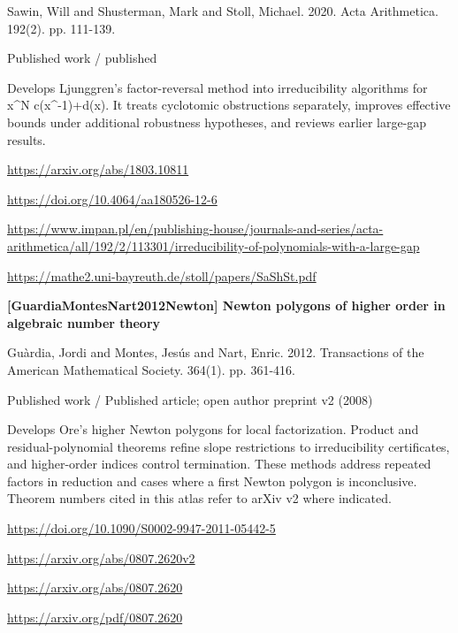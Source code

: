 \documentclass[11pt,a4paper,oneside,openany]{book}
\begin{document}
\color{black} Sawin, Will and Shusterman, Mark and Stoll, Michael. 2020. Acta Arithmetica. 192(2). pp. 111-139.\par
{\small\sffamily\color{atlasgold}Published work / published}\par
\color{black} Develops Ljunggren's factor-reversal method into irreducibility algorithms for x\textasciicircum{}N c(x\textasciicircum{}-1)+d(x). It treats cyclotomic obstructions separately, improves effective bounds under additional robustness hypotheses, and reviews earlier large-gap results.\par
{\footnotesize\url{https://arxiv.org/abs/1803.10811}}\par
{\footnotesize\url{https://doi.org/10.4064/aa180526-12-6}}\par
{\footnotesize\url{https://www.impan.pl/en/publishing-house/journals-and-series/acta-arithmetica/all/192/2/113301/irreducibility-of-polynomials-with-a-large-gap}}\par
{\footnotesize\url{https://mathe2.uni-bayreuth.de/stoll/papers/SaShSt.pdf}}\par
\vspace{9pt}
\hypertarget{ref:GuardiaMontesNart2012Newton}{}
{\sffamily\bfseries\color{atlasgreen}[GuardiaMontesNart2012Newton] Newton polygons of higher order in algebraic number theory}\par
\color{black} Guàrdia, Jordi and Montes, Jesús and Nart, Enric. 2012. Transactions of the American Mathematical Society. 364(1). pp. 361-416.\par
{\small\sffamily\color{atlasgold}Published work / Published article; open author preprint v2 (2008)}\par
\color{black} Develops Ore's higher Newton polygons for local factorization. Product and residual-polynomial theorems refine slope restrictions to irreducibility certificates, and higher-order indices control termination. These methods address repeated factors in reduction and cases where a first Newton polygon is inconclusive. Theorem numbers cited in this atlas refer to arXiv v2 where indicated.\par
{\footnotesize\url{https://doi.org/10.1090/S0002-9947-2011-05442-5}}\par
{\footnotesize\url{https://arxiv.org/abs/0807.2620v2}}\par
{\footnotesize\url{https://arxiv.org/abs/0807.2620}}\par
{\footnotesize\url{https://arxiv.org/pdf/0807.2620}}\par
\end{document}
